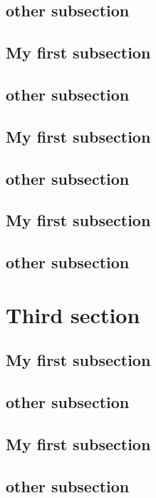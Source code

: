 \documentclass{book}
\begin{document}
\subsection{other subsection}


\subsection{My first subsection}

\subsection{other subsection}


\subsection{My first subsection}

\subsection{other subsection}


\subsection{My first subsection}

\subsection{other subsection}

\section{Third section}


\subsection{My first subsection}

\subsection{other subsection}


\subsection{My first subsection}

\subsection{other subsection}
\end{document}
